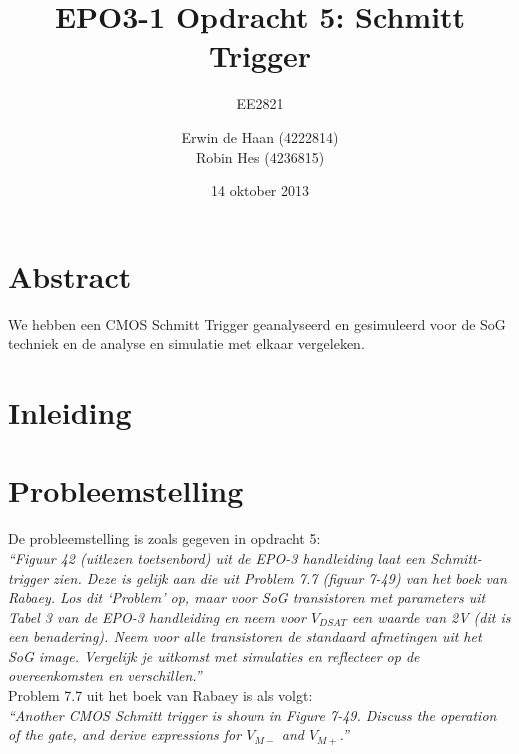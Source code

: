 \documentclass{scrartcl}  %
\author{Erwin {de Haan} (4222814)  \\{Robin Hes} (4236815)}
\title{EPO3-1 Opdracht 5: Schmitt Trigger}
\subtitle{EE2821}
\date{14 oktober 2013}
\begin{document}
\maketitle
\vspace{80 mm}

\section*{Abstract}
\label{sec:trig-abstr}
We hebben een CMOS Schmitt Trigger geanalyseerd en gesimuleerd voor de SoG techniek en de analyse en simulatie met elkaar vergeleken.

\newpage
\setlength{\cftbeforetoctitleskip}{-3em}
\tableofcontents

\section{Inleiding}
\label{sec:trig-inl}


\newpage
{}

\section{Probleemstelling}
\label{sec:trig-prob}
De probleemstelling is zoals gegeven in opdracht 5: \\
\textit{
``Figuur 42 (uitlezen toetsenbord) uit de EPO-3 handleiding laat een Schmitt-trigger zien. Deze is gelijk
aan die uit Problem 7.7 (figuur 7-49) van het boek van Rabaey. Los dit ‘Problem’ op, maar voor SoG
transistoren met parameters uit Tabel 3 van de EPO-3 handleiding en neem voor $V_{DSAT}$ een waarde van
2V (dit is een benadering). Neem voor alle transistoren de standaard afmetingen uit het SoG image.
Vergelijk je uitkomst met simulaties en reflecteer op de overeenkomsten en verschillen.''
}
\cite[2]{epo3-opdracht-5}
\\

Problem 7.7 uit het boek van Rabaey is als volgt: \\
\textit{
``Another CMOS Schmitt trigger is shown in Figure 7-49. Discuss the operation of the gate, and derive expressions for $V_{M-}$ and $V_{M+}$.''
}
\cite[367]{rabaey-integrated-circuits}
\\
\end{document}
